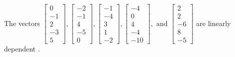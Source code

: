 \begin{exercise}
\begin{exerciseStatement}
  \end{exerciseStatement}
  \begin{exerciseAnswer}
   The vectors \(\left[\begin{array}{r}
0 \\
-1 \\
2 \\
-3 \\
5
\end{array}\right] , \left[\begin{array}{r}
-2 \\
-1 \\
4 \\
-5 \\
0
\end{array}\right] , \left[\begin{array}{r}
-1 \\
-4 \\
3 \\
1 \\
-2
\end{array}\right] , \left[\begin{array}{r}
-4 \\
0 \\
4 \\
-4 \\
-10
\end{array}\right] , \text{ and } \left[\begin{array}{r}
2 \\
2 \\
-6 \\
8 \\
-5
\end{array}\right]\) are 
  	 linearly dependent  .
  


  \end{exerciseAnswer}
\end{exercise}